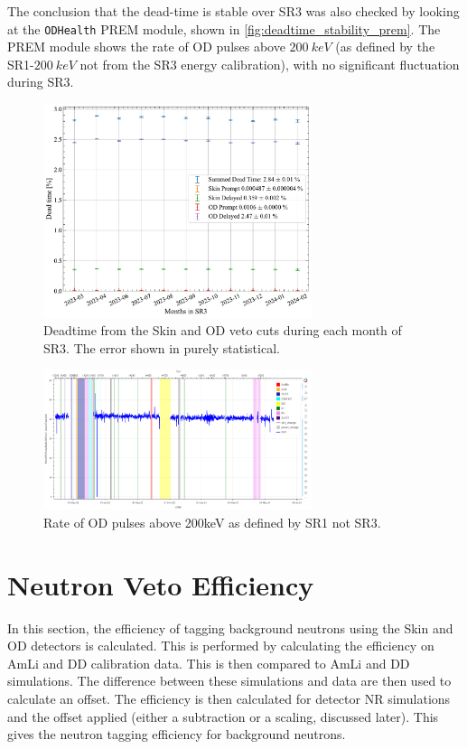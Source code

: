 The conclusion that the dead-time is stable over SR3 was also checked by looking at the \lstinline{ODHealth} PREM module, shown in \autoref{fig:deadtime_stability_prem}.
The PREM module shows the rate of OD pulses above $200~keV$ (as defined by the SR1-$200~keV$ not from the SR3 energy calibration), with no significant fluctuation during SR3.
\begin{figure}
    \centering
    \includegraphics[width=0.7\textwidth]{figures/VetoEfficiency/SR3DeadTimeAll_expoFunc.pdf}
    \caption{Deadtime from the Skin and OD veto cuts during each month of SR3. The error shown in purely statistical.}
    \label{fig:deadtime_stability}
\end{figure}
\begin{figure}
    \centering
    \includegraphics[width=0.7\textwidth]{figures/VetoEfficiency/prem_od_stability.png}
    \caption{Rate of OD pulses above 200keV as defined by SR1 not SR3.}
    \label{fig:deadtime_stability_prem}
\end{figure}

\section{Neutron Veto Efficiency \label{sec:efficiency}}
In this section, the efficiency of tagging background neutrons using the Skin and OD detectors is calculated.
This is performed by calculating the efficiency on AmLi and DD calibration data. 
This is then compared to AmLi and DD simulations.
The difference between these simulations and data are then used to calculate an offset.
The efficiency is then calculated for detector NR simulations and the offset applied (either a subtraction or a scaling, discussed later).
This gives the neutron tagging efficiency for background neutrons.

